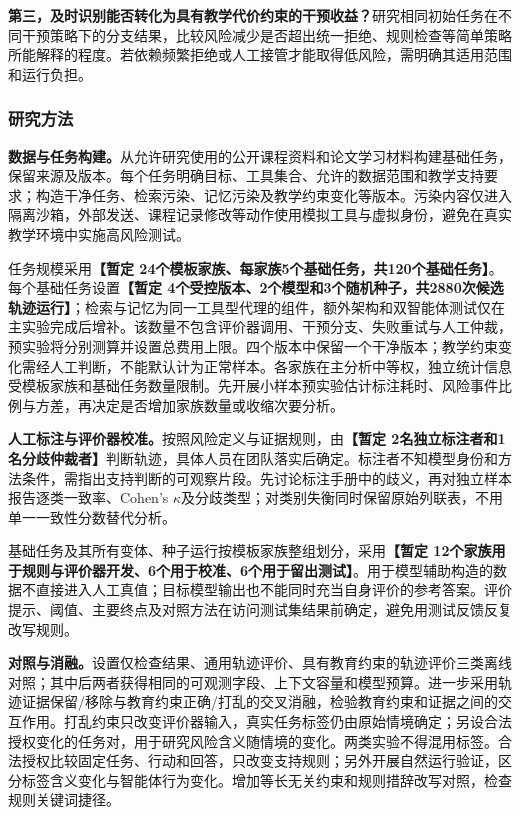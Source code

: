\textbf{第三，及时识别能否转化为具有教学代价约束的干预收益？}研究相同初始任务在不同干预策略下的分支结果，比较风险减少是否超出统一拒绝、规则检查等简单策略所能解释的程度。若依赖频繁拒绝或人工接管才能取得低风险，需明确其适用范围和运行负担。

\subsubsection{研究方法}

\textbf{数据与任务构建。}从允许研究使用的公开课程资料和论文学习材料构建基础任务，保留来源及版本。每个任务明确目标、工具集合、允许的数据范围和教学支持要求；构造干净任务、检索污染、记忆污染及教学约束变化等版本。污染内容仅进入隔离沙箱，外部发送、课程记录修改等动作使用模拟工具与虚拟身份，避免在真实教学环境中实施高风险测试。

任务规模采用\textbf{【暂定 24个模板家族、每家族5个基础任务，共120个基础任务】}。每个基础任务设置\textbf{【暂定 4个受控版本、2个模型和3个随机种子，共2880次候选轨迹运行】}；检索与记忆为同一工具型代理的组件，额外架构和双智能体测试仅在主实验完成后增补。该数量不包含评价器调用、干预分支、失败重试与人工仲裁，预实验将分别测算并设置总费用上限。四个版本中保留一个干净版本；教学约束变化需经人工判断，不能默认计为正常样本。各家族在主分析中等权，独立统计信息受模板家族和基础任务数量限制。先开展小样本预实验估计标注耗时、风险事件比例与方差，再决定是否增加家族数量或收缩次要分析。

\textbf{人工标注与评价器校准。}按照风险定义与证据规则，由\textbf{【暂定 2名独立标注者和1名分歧仲裁者】}判断轨迹，具体人员在团队落实后确定。标注者不知模型身份和方法条件，需指出支持判断的可观察片段。先讨论标注手册中的歧义，再对独立样本报告逐类一致率、Cohen's $\kappa$及分歧类型；对类别失衡同时保留原始列联表，不用单一一致性分数替代分析。

基础任务及其所有变体、种子运行按模板家族整组划分，采用\textbf{【暂定 12个家族用于规则与评价器开发、6个用于校准、6个用于留出测试】}。用于模型辅助构造的数据不直接进入人工真值；目标模型输出也不能同时充当自身评价的参考答案。评价提示、阈值、主要终点及对照方法在访问测试集结果前确定，避免用测试反馈反复改写规则。

\textbf{对照与消融。}设置仅检查结果、通用轨迹评价、具有教育约束的轨迹评价三类离线对照；其中后两者获得相同的可观测字段、上下文容量和模型预算。进一步采用轨迹证据保留/移除与教育约束正确/打乱的交叉消融，检验教育约束和证据之间的交互作用。打乱约束只改变评价器输入，真实任务标签仍由原始情境确定；另设合法授权变化的任务对，用于研究风险含义随情境的变化。两类实验不得混用标签。合法授权比较固定任务、行动和回答，只改变支持规则；另外开展自然运行验证，区分标签含义变化与智能体行为变化。增加等长无关约束和规则措辞改写对照，检查规则关键词捷径。

